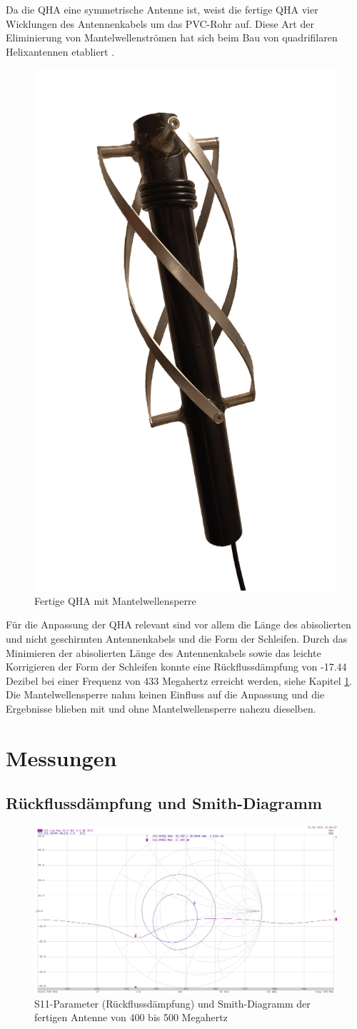 Da die QHA eine symmetrische Antenne ist, weist die fertige QHA vier Wicklungen des Antennenkabels um das PVC-Rohr auf. Diese Art der Eliminierung von Mantelwellenströmen hat sich beim Bau von quadrifilaren Helixantennen etabliert \cite{noauthor_quadrifilar_nodate}. 

\begin{figure} [H]
	\centering
	\includegraphics[width=.25\linewidth]{../ref/qha_fertig.png}
	\caption{Fertige QHA mit Mantelwellensperre}
	\label{fig:fertig_qha}
\end{figure}

Für die Anpassung der QHA relevant sind vor allem die Länge des abisolierten und nicht geschirmten Antennenkabels und die Form der Schleifen. Durch das Minimieren der abisolierten Länge des Antennenkabels sowie das leichte Korrigieren der Form der Schleifen konnte eine Rückflussdämpfung von -17.44 Dezibel bei einer Frequenz von 433 Megahertz erreicht werden, siehe Kapitel \ref{sec:messungen_qha}. Die Mantelwellensperre nahm keinen Einfluss auf die Anpassung und die Ergebnisse blieben mit und ohne Mantelwellensperre nahezu dieselben. 

\section{Messungen}
\label{sec:messungen_qha}
\subsection{Rückflussdämpfung und Smith-Diagramm}
\begin{figure} [H]
	\centering
	\includegraphics[width=\linewidth]{../ref/qfh_s11.png}
	\caption{S11-Parameter (Rückflussdämpfung) und Smith-Diagramm der fertigen Antenne von 400 bis 500 Megahertz}
	\label{fig:fertig_qha}
\end{figure}

